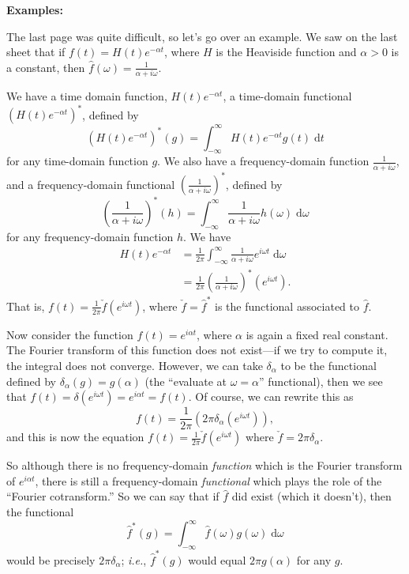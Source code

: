 \documentclass{article}
\newcommand{\diff}{\;\mathrm{d}}
\begin{document}
\textbf{Examples:}\bigskip


The last page was quite difficult, so let's go over an example. We saw on the last sheet that if $f(t)=H(t)e^{-\alpha t}$, where $H$ is the Heaviside function and $\alpha>0$ is a constant, then $\hat{f}(\omega)=\frac{1}{\alpha+i\omega}$.

We have a time domain function, $H(t)e^{-\alpha t}$, a time-domain functional $\left(H(t)e^{-\alpha t}\right)^*$, defined by
\[\left(H(t)e^{-\alpha t}\right)^*(g)=\int_{-\infty}^\infty H(t)e^{-\alpha t}g(t)\diff t\]
for any time-domain function $g$. We also have a frequency-domain function $\frac{1}{\alpha+i\omega}$, and a frequency-domain functional $\left(\frac{1}{\alpha+i\omega}\right)^*$, defined by
\[\left(\frac{1}{\alpha+i\omega}\right)^*(h)=\int_{-\infty}^\infty \frac{1}{\alpha+i\omega} h(\omega)\diff \omega\]
for any frequency-domain function $h$. We have
\begin{align*}
	H(t)e^{-\alpha t}&=\frac{1}{2\pi}\int_{-\infty}^\infty \frac{1}{\alpha+i\omega}e^{i\omega t}\diff \omega\\
	&=\frac{1}{2\pi}\left(\frac{1}{\alpha+i\omega}\right)^*\left(e^{i\omega t}\right).
\end{align*}
That is, $f(t)=\frac{1}{2\pi}\check{f}\left(e^{i\omega t}\right)$, where $\check{f}=\hat{f}^*$ is the functional associated to $\hat{f}$.\bigskip

Now consider the function $f(t)=e^{i\alpha t}$, where $\alpha$ is again a fixed real constant. The Fourier transform of this function does not exist---if we try to compute it, the integral does not converge. However, we can take $\delta_\alpha$ to be the functional defined by $\delta_\alpha(g)=g(\alpha)$ (the ``evaluate at $\omega=\alpha$'' functional), then we see that $f(t)=\delta\left(e^{i\omega t}\right)=e^{i\alpha t}=f(t)$. Of course, we can rewrite this as
\[f(t)=\frac{1}{2\pi}\left(2\pi \delta_\alpha\left(e^{i\omega t}\right)\right),\]
and this is now the equation $f(t)=\frac{1}{2\pi}\check{f}\left(e^{i\omega t}\right)$ where $\check{f}=2\pi\delta_\alpha$.

So although there is no frequency-domain \textit{function} which is the Fourier transform of $e^{i\alpha t}$, there is still a frequency-domain \textit{functional} which plays the role of the ``Fourier cotransform.'' So we can say that if $\hat{f}$ did exist (which it doesn't), then the functional
\[\hat{f}^*(g)=\int_{-\infty}^\infty \hat{f}(\omega)g(\omega)\diff\omega\]
would be precisely $2\pi\delta_\alpha$; \textit{i.e.}, $\hat{f}^*(g)$ would equal $2\pi g(\alpha)$ for any $g$.
\end{document}
